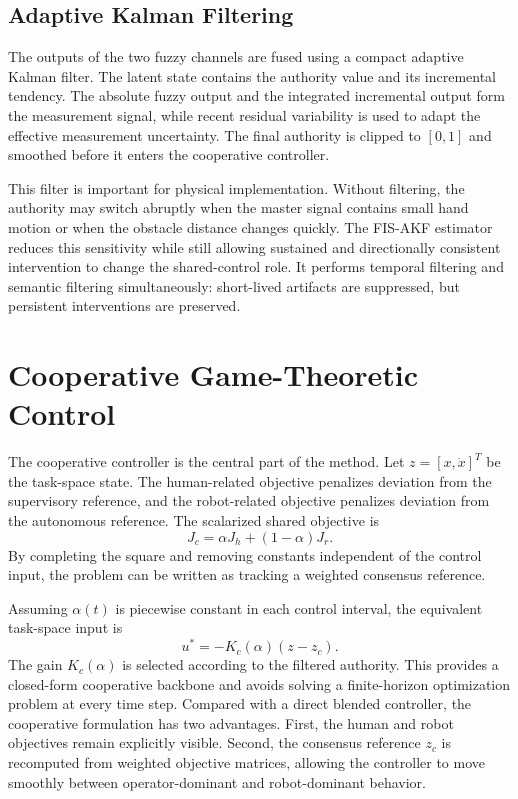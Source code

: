 \documentclass[conference]{IEEEtran}
\begin{document}
\subsection{Adaptive Kalman Filtering}
The outputs of the two fuzzy channels are fused using a compact adaptive Kalman filter. The latent state contains the authority value and its incremental tendency. The absolute fuzzy output and the integrated incremental output form the measurement signal, while recent residual variability is used to adapt the effective measurement uncertainty. The final authority is clipped to $[0,1]$ and smoothed before it enters the cooperative controller.

This filter is important for physical implementation. Without filtering, the authority may switch abruptly when the master signal contains small hand motion or when the obstacle distance changes quickly. The FIS-AKF estimator reduces this sensitivity while still allowing sustained and directionally consistent intervention to change the shared-control role. It performs temporal filtering and semantic filtering simultaneously: short-lived artifacts are suppressed, but persistent interventions are preserved.

\section{Cooperative Game-Theoretic Control}
The cooperative controller is the central part of the method. Let $z=[x,\dot{x}]^T$ be the task-space state. The human-related objective penalizes deviation from the supervisory reference, and the robot-related objective penalizes deviation from the autonomous reference. The scalarized shared objective is
\begin{equation}
 J_c=\alpha J_h+(1-\alpha)J_r.
\end{equation}
By completing the square and removing constants independent of the control input, the problem can be written as tracking a weighted consensus reference.

Assuming $\alpha(t)$ is piecewise constant in each control interval, the equivalent task-space input is
\begin{equation}
 u^*=-K_c(\alpha)(z-z_c).
\end{equation}
The gain $K_c(\alpha)$ is selected according to the filtered authority. This provides a closed-form cooperative backbone and avoids solving a finite-horizon optimization problem at every time step. Compared with a direct blended controller, the cooperative formulation has two advantages. First, the human and robot objectives remain explicitly visible. Second, the consensus reference $z_c$ is recomputed from weighted objective matrices, allowing the controller to move smoothly between operator-dominant and robot-dominant behavior.
\end{document}
